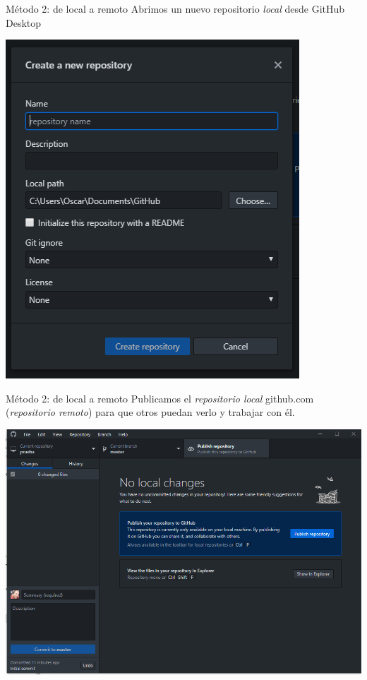 \documentclass[aspectratio=169, xcolor={usenames,svgnames,dvipsnames}]{beamer}
\begin{document}
\begin{frame}[label={sec:org54d0364}]{Método 2: de local a remoto}
Abrimos un nuevo repositorio \emph{local} desde GitHub Desktop

\begin{center}
\end{center}

\begin{center}
\includegraphics[height=0.7\textheight]{figs/Desktop_NewRepository.png}
\end{center}
\end{frame}

\begin{frame}[label={sec:org9b21b71}]{Método 2: de local a remoto}
Publicamos el \emph{repositorio local} github.com (\emph{repositorio remoto}) para que otros puedan verlo y trabajar con él.

\begin{center}
\includegraphics[width=.9\linewidth]{figs/Desktop_PublishRepository.png}
\end{center}
\end{frame}
\end{document}
